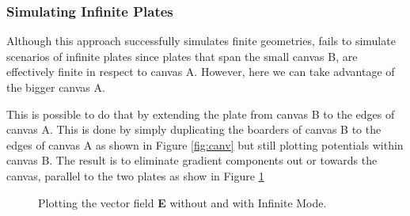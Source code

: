 \documentclass[a4paper]{article}
\begin{document}
\subsubsection{Simulating Infinite Plates}
Although this approach successfully simulates finite geometries, fails to simulate scenarios of infinite plates since plates that span the small canvas B, are effectively finite in respect to canvas A. However, here we can take advantage of the bigger canvas A.

This is possible to do that by extending the plate from canvas B to the edges of canvas A. This is done by simply duplicating the boarders of canvas B to the edges of canvas A as shown in Figure \ref{fig:canv} but still plotting potentials within canvas B. The result is to eliminate gradient components out or towards the canvas, parallel to the two plates as show in Figure \ref{fig:efield}

\begin{figure}[!h]
  \centering
  \hfill
  \caption{Plotting the vector field \textbf{E} without and with Infinite Mode.}
\label{fig:efield}
\end{figure}
\end{document}
